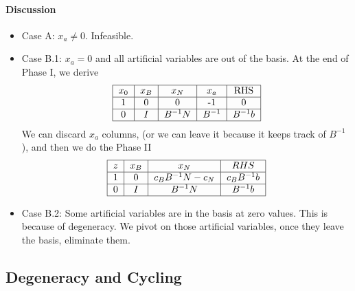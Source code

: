             \paragraph{Discussion}
                \begin{itemize}
                    \item Case A: $x_a \ne 0$. Infeasible.
                    \item Case B.1: $x_a = 0$ and all artificial variables are out of the basis. At the end of Phase I, we derive
                    \begin{align}
                        \begin{tabular} {|c|c|c|c|c|}
                            \hline
                            $x_0$ & $x_B$ & $x_N$ & $x_a$ & RHS \\
                            \hline
                            1 & 0 & 0 & -1 & 0\\
                            \hline
                            0 & $I$ & $B^{-1}N$ & $B^{-1}$ & $B^{-1}b$ \\
                            \hline
                        \end{tabular} \nonumber
                    \end{align}
                    We can discard $x_a$ columns, (or we can leave it because it keeps track of $B^{-1}$), and then we do the Phase II
                    \begin{align}
                        \begin{tabular} {|c|c|c|c|}
                            \hline
                            $z$ & $x_B$ & $x_N$ & $RHS$ \\
                            \hline
                            1 & 0 & $c_BB^{-1}N - c_N$ & $c_BB^{-1}b$ \\
                            \hline
                            0 & $I$ & $B^{-1}N$ & $B^{-1}b$ \\
                            \hline
                        \end{tabular} \nonumber     
                    \end{align}
                    \item Case B.2: Some artificial variables are in the basis at zero values. This is because of degeneracy. We pivot on those artificial variables, once they leave the basis, eliminate them.
                \end{itemize}

        \subsection{Degeneracy and Cycling}
